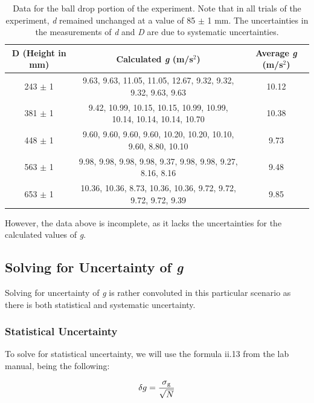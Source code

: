 \documentclass[titlepage]{article}
\begin{document}
\begin{table}[!htbp]
\renewcommand{\arraystretch}{1.3}
\centering
\scalebox{0.7}
{
\begin{tabular}{c|c|c}
    \hline
    \hline
    D (Height in mm) & Calculated \textit{g} (m/s$^2$) & Average \textit{g} (m/s$^2$)\\
    \hline
    \hline

    243 $\pm$ 1 &  9.63, 9.63, 11.05, 11.05, 12.67, 9.32, 9.32, 9.32, 9.63, 9.63 &  10.12 \\
    \hline

    381 $\pm$ 1 & 9.42, 10.99, 10.15, 10.15, 10.99, 10.99, 10.14, 10.14, 10.14, 10.70 &  10.38 \\
    \hline

    448 $\pm$ 1 & 9.60, 9.60, 9.60, 9.60, 10.20, 10.20, 10.10, 9.60, 8.80, 10.10 &  9.73 \\
    \hline

    563 $\pm$ 1 &  9.98, 9.98, 9.98, 9.98, 9.37, 9.98, 9.98, 9.27, 8.16, 8.16 &  9.48 \\ 
    \hline

    653 $\pm$ 1 &  10.36, 10.36, 8.73, 10.36, 10.36, 9.72, 9.72, 9.72, 9.72, 9.39 &  9.85 \\
    \hline
\end{tabular}
}
\caption{Data for the ball drop portion of the experiment. Note that in all trials of the experiment, \textit{d} remained unchanged at a value of 85 $\pm$ 1 mm. The uncertainties in the measurements of \textit{d} and \textit{D} are due to systematic uncertainties.}
\end{table}

However, the data above is incomplete, as it lacks the uncertainties for the calculated values of \textit{g}.

\subsection{Solving for Uncertainty of \textit{g}}
Solving for uncertainty of \textit{g} is rather convoluted in this particular scenario as there is both statistical and systematic uncertainty.

\subsubsection{Statistical Uncertainty}
To solve for statistical uncertainty, we will use the formula ii.13 from the lab manual, being the following:

\begin{align}
     \delta g = \frac{\sigma\textsubscript{g}}{\sqrt{N}}
\end{align}
\end{document}
